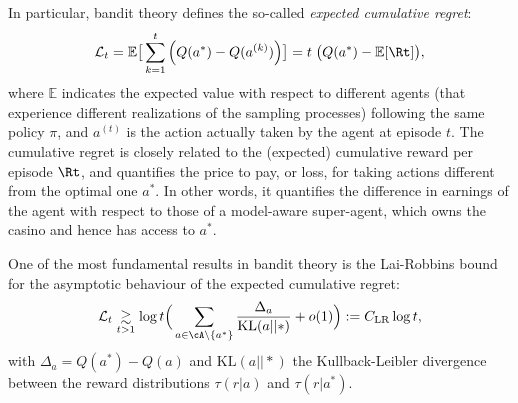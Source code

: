 In particular, bandit theory defines the so-called \textit{expected cumulative regret}:
\begin{equation}\label{eq:CumRegegret}
  \mathcal{L}_t =  \mathbb{E}\big[ \sum_{k=1}^{t} \Big( Q(a^{*}) - Q(a^{(k)}) \Big) \big] = t \;\big(Q(a^{*}) - \mathbb{E}[ \Rt ]\big),
\end{equation}
where $\mathbb{E}$ indicates the expected value with respect to different agents (that experience different realizations of the sampling processes) following the same policy $\pi$,%
and $a^{(t)}$ is the action actually taken by the agent at episode $t$. The cumulative regret is closely related to the (expected) cumulative reward per episode $\Rt$, and quantifies the price to pay, or loss, for taking actions different from the optimal one $a^{*}$. In other words, it quantifies the difference in earnings of the agent with respect to those of a model-aware super-agent, which owns the casino and hence has access to $a^*$.

One of the most fundamental results in bandit theory is the Lai-Robbins bound~\cite{Lai1985} for the asymptotic behaviour of the expected cumulative regret:
\begin{equation}\label{eq:RLBOUND}
 \mathcal{L}_t \underset{t > 1}{\gtrsim} \log t \Big( \sum_{a \in \cA\backslash \{a^{*}\}} \frac{\Delta_a}{\text{KL}(a||*)} + o(1) \Big):=C_{\mathrm{LR}} \log t,
\end{equation}
with $\Delta_a = Q(a^{*}) - Q(a)$ and $\text{KL}(a||*)$ the Kullback-Leibler divergence between the reward distributions $\tau(r|a) $ and $ \tau(r|a^{*})$.

